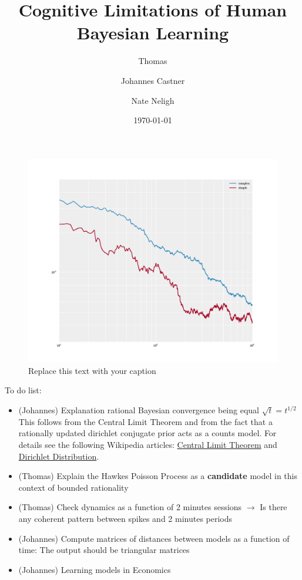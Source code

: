 \documentclass{article}
\begin{document}
\title{Cognitive Limitations of Human Bayesian Learning}


\author{Thomas}

  
\author{Johannes Castner}
  
\author{Nate Neligh}
  



\date{\today}



\maketitle 




\begin{figure}[h!]
\begin{center}
\includegraphics[width=0.7\columnwidth]{figures/empiricalConvergenceLogLog/empiricalConvergenceLogLog}
\caption{\label{fig:fully_rational}
Replace this text with your caption%
}
\end{center}
\end{figure}

To do list:
\begin{itemize}
\item (Johannes) Explanation rational Bayesian convergence being equal $\sqrt{t} = t^{1/2}$
\\
This follows from the Central Limit Theorem and from the fact that a rationally updated dirichlet conjugate prior acts as a counts model. For details see the following Wikipedia articles: \href{https://en.wikipedia.org/wiki/Central_limit_theorem}{Central Limit Theorem} and \href{https://en.wikipedia.org/wiki/Dirichlet_distribution}{Dirichlet Distribution}. 
\item (Thomas) Explain the Hawkes Poisson Process as a {\bf candidate} model in this context of bounded rationality
\item (Thomas) Check dynamics as a function of 2 minutes sessions $\rightarrow$ Is there any coherent pattern between spikes and 2 minutes periods
\item (Johannes) Compute  matrices of distances between models as a function of time: The output should be triangular matrices 
\item (Johannes) Learning models in Economics
\end{itemize}
  
\end{document}
